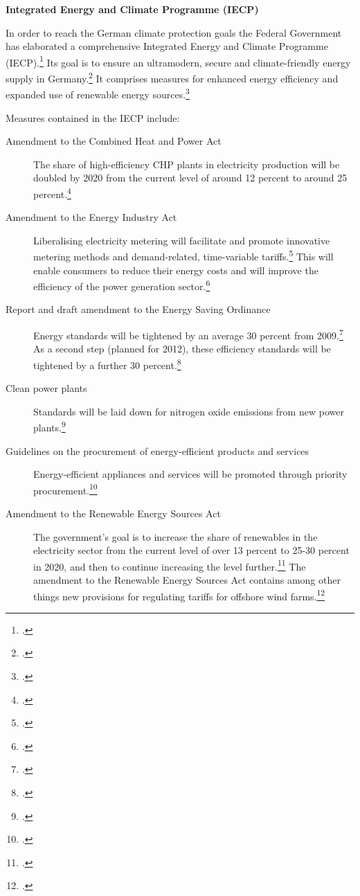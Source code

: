 \textbf{Integrated Energy and Climate Programme (IECP)}



In order to reach the German climate protection goals the Federal Government has elaborated a comprehensive Integrated Energy and Climate Programme (IECP).\footcite[][]{GermanyIECP}
Its goal is to ensure an ultramodern, secure and climate-friendly energy supply in Germany.\footcite[][]{GermanyIECP}
It comprises measures for enhanced energy efficiency and expanded use of renewable energy sources.\footcite[][]{GermanyIECP}



Measures contained in the IECP include:
\begin{description}
	\item[Amendment to the Combined Heat and Power Act] The share of high-efficiency CHP plants in electricity production will be doubled by 2020 from the current level of around 12 percent to around 25 percent.\footcite[][]{BMUprogramme}
	\item[Amendment to the Energy Industry Act] Liberalising electricity metering will facilitate and promote innovative metering methods and demand-related, time-variable tariffs.\footcite[][]{BMUprogramme}
	This will enable consumers to reduce their energy costs and will improve the efficiency of the power generation sector.\footcite[][]{BMUprogramme}
	\item[Report and draft amendment to the Energy Saving Ordinance] Energy standards will be tightened by an average 30 percent from 2009.\footcite[][]{BMUprogramme}
	As a second step (planned for 2012), these efficiency standards will be tightened by a further 30 percent.\footcite[][]{BMUprogramme}
	\item[Clean power plants] Standards will be laid down for nitrogen oxide emissions from new power plants.\footcite[][]{BMUprogramme}
	\item[Guidelines on the procurement of energy-efficient products and services] Energy-efficient appliances and services will be promoted through priority procurement.\footcite[][]{BMUprogramme}
	\item[Amendment to the Renewable Energy Sources Act] The government’s goal is to increase the share of renewables in the electricity sector from the current level of over 13 percent to 25-30 percent in 2020, and then to continue increasing the level further.\footcite[][]{BMUprogramme}
	The amendment to the Renewable Energy Sources Act contains among other things new provisions for regulating tariffs for offshore wind farms.\footcite[][]{BMUprogramme}

\end{description}
